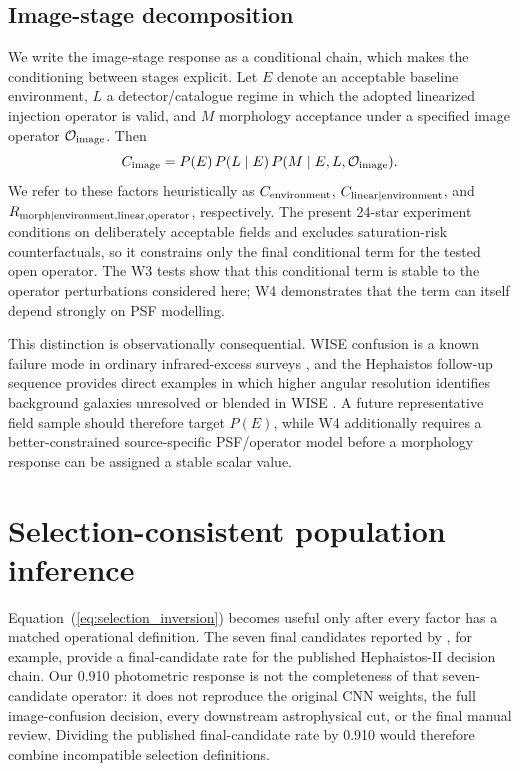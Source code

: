 \documentclass[fleqn,usenatbib]{mnras}
\begin{document}
\subsection{Image-stage decomposition}

We write the image-stage response as a conditional chain, which makes the conditioning between stages explicit. Let $E$ denote an acceptable baseline environment, $L$ a detector/catalogue regime in which the adopted linearized injection operator is valid, and $M$ morphology acceptance under a specified image operator $\mathcal{O}_{\rm image}$. Then
\begin{equation}
C_{\rm image}
=P(E)\,P(L\mid E)\,P(M\mid E,L,\mathcal{O}_{\rm image}).
\label{eq:image_decomp}
\end{equation}
We refer to these factors heuristically as $C_{\rm environment}$, $C_{\rm linear\mid environment}$, and $R_{\rm morph\mid environment,linear,operator}$, respectively. The present 24-star experiment conditions on deliberately acceptable fields and excludes saturation-risk counterfactuals, so it constrains only the final conditional term for the tested open operator. The W3 tests show that this conditional term is stable to the operator perturbations considered here; W4 demonstrates that the term can itself depend strongly on PSF modelling.

This distinction is observationally consequential. WISE confusion is a known failure mode in ordinary infrared-excess surveys \citep{KennedyWyatt2012}, and the Hephaistos follow-up sequence provides direct examples in which higher angular resolution identifies background galaxies unresolved or blended in WISE \citep{Ren2025,Ren2026,Zackrisson2026}. A future representative field sample should therefore target $P(E)$, while W4 additionally requires a better-constrained source-specific PSF/operator model before a morphology response can be assigned a stable scalar value.

\section{Selection-consistent population inference}
\label{sec:population}

Equation~(\ref{eq:selection_inversion}) becomes useful only after every factor has a matched operational definition. The seven final candidates reported by \citet{Suazo2024}, for example, provide a final-candidate rate for the published Hephaistos-II decision chain. Our 0.910 photometric response is not the completeness of that seven-candidate operator: it does not reproduce the original CNN weights, the full image-confusion decision, every downstream astrophysical cut, or the final manual review. Dividing the published final-candidate rate by 0.910 would therefore combine incompatible selection definitions.
\end{document}

